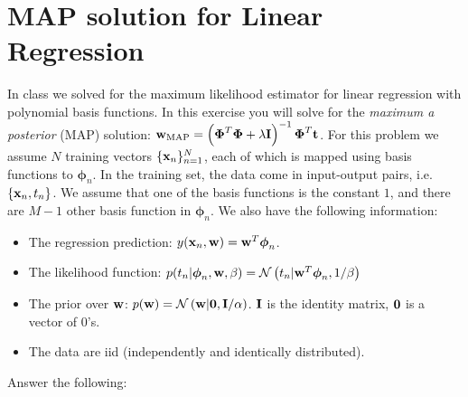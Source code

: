 \documentclass[12pt,a4paper]{article}
\newcommand{\lp}{\left(}
\newcommand{\rp}{\right)}
\newcommand{\DataIndex}{n}
\newcommand{\eye}{{\bf I}}
\newcommand{\xscalar}{x}
\newcommand{\xvec}{{\bf \xscalar}}
\newcommand{\tscalar}{t}
\newcommand{\tvec}{{\bf \tscalar}}
\newcommand{\yscalar}{y}
\newcommand{\wscalar}{w}
\newcommand{\wvec}{{\bf \wscalar}}
\newcommand{\wvecMAP}{\wvec_{\text{MAP}}}
\newcommand{\xvecn}{\xvec_{\DataIndex}}
\newcommand{\tn}{\tscalar_{\DataIndex}}
\newcommand{\yfunc}{\yscalar}
\newcommand{\zerovec}{ {\bf 0}}
\newcommand{\phivec}{\boldsymbol{\phi}}
\newcommand{\Phimat}{\boldsymbol{\Phi}}
\newcommand{\phivecn}{\phivec_{\DataIndex}}
\begin{document}
\section{MAP solution for Linear Regression}
In class we solved for the maximum likelihood estimator for linear regression with polynomial basis functions.  In this exercise you will solve for the {\em maximum a posterior} (MAP) solution: $\wvecMAP = \lp \Phimat^T \Phimat + \lambda \eye\rp^{-1} \Phimat^T \tvec$.  For this problem we assume $N$ training vectors $\{ \xvecn \}_{n=1}^N$, each of which is mapped using basis functions to $\phivecn$.  In the training set, the data come in input-output pairs, i.e. $\{\xvecn, \tn\}$.  We assume that one of the basis functions is the constant $1$, and there are $M-1$ other basis function in $\phivecn$.  We also have the following information:
\begin{itemize}
  \item The regression prediction: $\yfunc(\xvecn, \wvec) = \wvec^T\phivecn$.
  \item The likelihood function: $p( \tn | \phivecn, \wvec, \beta ) = \mathcal{N}\lp \tn | \wvec^T\phivecn, 1/\beta \rp$
  \item The prior over $\wvec$: $p(\wvec) = \mathcal{N}\lp \wvec | \zerovec, \eye/\alpha\rp$.  $\eye$ is the identity matrix, $\zerovec$ is a vector of $0$'s.
  \item The data are iid (independently and identically distributed).
\end{itemize}
Answer the following:
\end{document}
